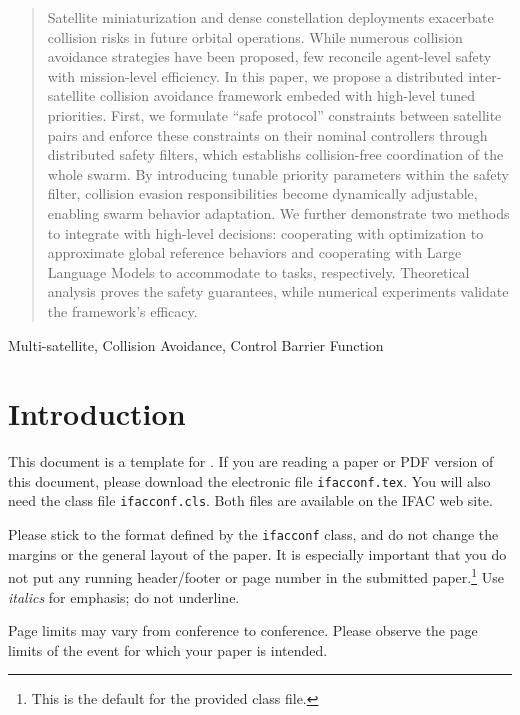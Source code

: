 \documentclass{ifacconf}
\begin{document}
\begin{frontmatter}
\begin{abstract}
   Satellite miniaturization and dense constellation deployments exacerbate collision risks in future orbital operations. 
   While numerous collision avoidance strategies have been proposed, few reconcile agent-level safety with mission-level efficiency.
   In this paper, we propose a distributed inter-satellite collision avoidance framework embeded with high-level tuned priorities.
   First, we formulate ``safe protocol'' constraints between satellite pairs and enforce these constraints on their nominal controllers through distributed safety filters, which establishs collision-free coordination of the whole swarm.
   By introducing tunable priority parameters within the safety filter, collision evasion responsibilities become dynamically adjustable, enabling swarm behavior adaptation. 
   We further demonstrate two methods to integrate with high-level decisions: cooperating with optimization to approximate global reference behaviors and cooperating with Large Language Models to accommodate to tasks, respectively.
   Theoretical analysis proves the safety guarantees, while numerical experiments validate the framework's efficacy.
\end{abstract}

\begin{keyword}
Multi-satellite, Collision Avoidance, Control Barrier Function
\end{keyword}

\end{frontmatter}

\section{Introduction}
This document is a template for \LaTeXe. If you are reading a paper or
PDF version of this document, please download the electronic file
\texttt{ifacconf.tex}. You will also need the class file
\texttt{ifacconf.cls}. Both files are available on the IFAC web site.

Please stick to the format defined by the \texttt{ifacconf} class, and
do not change the margins or the general layout of the paper. It
is especially important that you do not put any running header/footer
or page number in the submitted paper.\footnote{
This is the default for the provided class file.}
Use \emph{italics} for emphasis; do not underline.

Page limits may vary from conference to conference. Please observe the 
page limits of the event for which your paper is intended. \cite{Abl:56}
\end{document}
